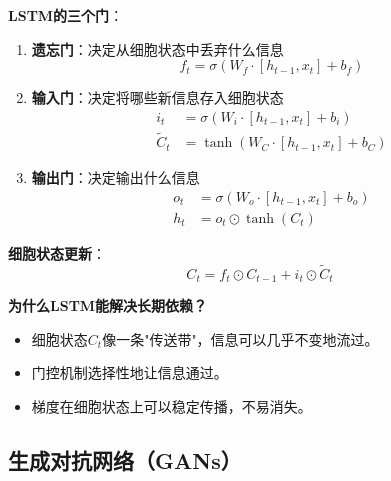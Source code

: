 \textbf{LSTM的三个门}：
\begin{enumerate}
    \item \textbf{遗忘门}：决定从细胞状态中丢弃什么信息
    \[
    f_t = \sigma(W_f \cdot [h_{t-1}, x_t] + b_f)
    \]
    
    \item \textbf{输入门}：决定将哪些新信息存入细胞状态
    \[
    \begin{aligned}
    i_t &= \sigma(W_i \cdot [h_{t-1}, x_t] + b_i) \\
    \tilde{C}_t &= \tanh(W_C \cdot [h_{t-1}, x_t] + b_C)
    \end{aligned}
    \]
    
    \item \textbf{输出门}：决定输出什么信息
    \[
    \begin{aligned}
    o_t &= \sigma(W_o \cdot [h_{t-1}, x_t] + b_o) \\
    h_t &= o_t \odot \tanh(C_t)
    \end{aligned}
    \]
\end{enumerate}

\textbf{细胞状态更新}：
\[
C_t = f_t \odot C_{t-1} + i_t \odot \tilde{C}_t
\]

\begin{remark}
    \textbf{为什么LSTM能解决长期依赖？}
    \begin{itemize}
        \item 细胞状态$C_t$像一条"传送带"，信息可以几乎不变地流过。
        \item 门控机制选择性地让信息通过。
        \item 梯度在细胞状态上可以稳定传播，不易消失。
    \end{itemize}
\end{remark}

\subsection{生成对抗网络（GANs）}

